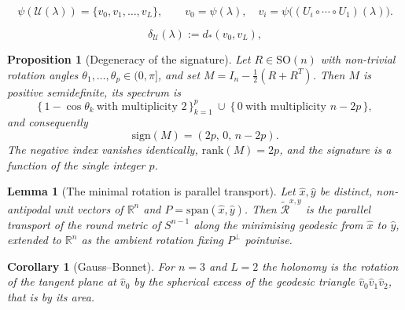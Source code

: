 \documentclass[10pt,a4paper]{amsart}
\newtheorem{proposition}{Proposition}
\newtheorem{lemma}{Lemma}
\newtheorem{corollary}{Corollary}
\newcommand{\R}{\mathbb{R}}
\newcommand{\Rmin}{\widetilde{\mathcal{R}}}
\newcommand{\SO}{\mathrm{SO}}
\newcommand{\Uc}{\mathcal{U}}
\newcommand{\sgn}{\mathrm{sign}}
\begin{document}
\begin{equation}\label{eq:chain}
\psi(\Uc(\lambda)) = \{v_0, v_1, \dots, v_L\}, \qquad
v_0 = \psi(\lambda), \quad
v_i = \psi\bigl((U_i \circ \cdots \circ U_1)(\lambda)\bigr).
\end{equation}

\begin{equation}\label{eq:deficit}
\delta_\Uc(\lambda) := d_*(v_0, v_L),
\end{equation}

\begin{proposition}[Degeneracy of the signature]\label{prop:sig}
Let $R \in \SO(n)$ with non-trivial rotation angles
$\theta_1,\dots,\theta_p \in (0,\pi]$, and set
$M = I_n - \tfrac12(R+R^T)$. Then $M$ is positive semidefinite, its
spectrum is
\begin{equation}\label{eq:spectrum}
\bigl\{\, 1 - \cos\theta_k \ \text{with multiplicity } 2 \,\bigr\}_{k=1}^{p}
\ \cup\ \bigl\{\, 0 \ \text{with multiplicity } n-2p \,\bigr\},
\end{equation}
and consequently
\begin{equation}\label{eq:signature}
\sgn(M) = (2p,\, 0,\, n-2p).
\end{equation}
The negative index vanishes identically, $\mathrm{rank}(M) = 2p$, and
the signature is a function of the single integer $p$.
\end{proposition}

\begin{lemma}[The minimal rotation is parallel transport]\label{lem:transport}
Let $\hat{x},\hat{y}$ be distinct, non-antipodal unit vectors of $\R^n$
and $P = \mathrm{span}(\hat{x},\hat{y})$. Then $\Rmin^{x,y}$ is the
parallel transport of the round metric of $S^{n-1}$ along the minimising
geodesic from $\hat{x}$ to $\hat{y}$, extended to $\R^n$ as the ambient
rotation fixing $P^{\perp}$ pointwise.
\end{lemma}

\begin{corollary}[Gauss--Bonnet]\label{cor:gaussbonnet}
For $n = 3$ and $L = 2$ the holonomy is the rotation of the tangent
plane at $\hat{v}_0$ by the spherical excess of the geodesic triangle
$\hat{v}_0\hat{v}_1\hat{v}_2$, that is by its area.
\end{corollary}
\end{document}
